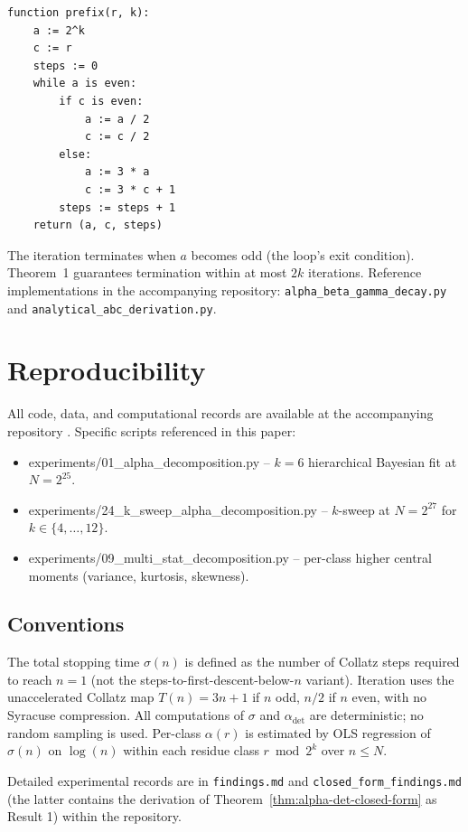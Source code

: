 \documentclass[pdflatex,sn-mathphys-num]{sn-jnl}
\theoremstyle{thmstyleone}%
\theoremstyle{definition}
\theoremstyle{plain}
\begin{document}
\begin{verbatim}
function prefix(r, k):
    a := 2^k
    c := r
    steps := 0
    while a is even:
        if c is even:
            a := a / 2
            c := c / 2
        else:
            a := 3 * a
            c := 3 * c + 1
        steps := steps + 1
    return (a, c, steps)
\end{verbatim}

The iteration terminates when $a$ becomes odd (the loop's exit condition). Theorem~1 guarantees termination within at most $2k$ iterations. Reference implementations in the accompanying repository: \texttt{alpha\_beta\_gamma\_decay.py} and \texttt{analytical\_abc\_derivation.py}.

\section{Reproducibility}\label{app-reprod}
\label{app:reproducibility}
All code, data, and computational records are available at the accompanying repository \citep{humphrey_collatz_2026}. Specific scripts referenced in this paper:

\begin{itemize}
    \item experiments/01\_alpha\_decomposition.py -- $k=6$ hierarchical Bayesian fit at $N = 2^{25}$.
    \item experiments/24\_k\_sweep\_alpha\_decomposition.py -- $k$-sweep at $N = 2^{27}$ for $k \in \{4, \ldots, 12\}$.
    \item experiments/09\_multi\_stat\_decomposition.py -- per-class higher central moments (variance, kurtosis, skewness).
\end{itemize}

\subsection{Conventions}
The total stopping time $\sigma(n)$ is defined as the number of Collatz steps required to reach $n = 1$ (not the steps-to-first-descent-below-$n$ variant). Iteration uses the unaccelerated Collatz map $T(n) = 3n+1$ if $n$ odd, $n/2$ if $n$ even, with no Syracuse compression. All computations of $\sigma$ and $\alpha_{\text{det}}$ are deterministic; no random sampling is used. Per-class $\alpha(r)$ is estimated by OLS regression of $\sigma(n)$ on $\log(n)$ within each residue class $r \bmod 2^k$ over $n \leq N$.

Detailed experimental records are in \texttt{findings.md} and \texttt{closed\_form\_findings.md} (the latter contains the derivation of Theorem~\ref{thm:alpha-det-closed-form} as Result 1) within the repository.





\end{document}
